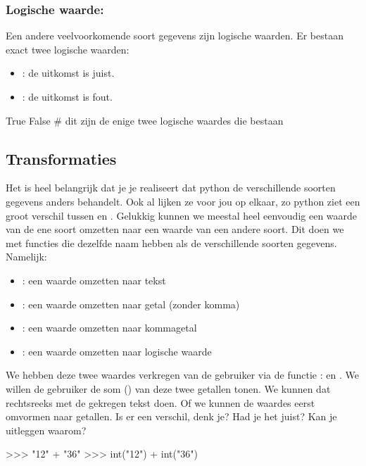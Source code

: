 \subsubsection{Logische waarde: \booleantype}

Een andere veelvoorkomende soort gegevens zijn logische waarden.
Er bestaan exact twee logische waarden:
\begin{itemize}
	\item \true: de uitkomst is juist.
	\item \false: de uitkomst is fout.
\end{itemize}
\begin{pyEnv}
True
False
# dit zijn de enige twee logische waardes die bestaan
\end{pyEnv}

\subsection{Transformaties}

Het is heel belangrijk dat je je realiseert dat python de verschillende soorten gegevens anders behandelt.
Ook al lijken ze voor jou op elkaar, zo python ziet een groot verschil tussen  en .
Gelukkig kunnen we meestal heel eenvoudig een waarde van de ene soort omzetten naar een waarde van een andere soort.
Dit doen we met functies die dezelfde naam hebben als de verschillende soorten gegevens.  %
Namelijk:
\begin{itemize}
	\item {}: een waarde omzetten naar tekst
	\item {}: een waarde omzetten naar getal (zonder komma)
	\item {}: een waarde omzetten naar kommagetal
	\item {}: een waarde omzetten naar logische waarde
\end{itemize}

\begin{letsTryOut}
	We hebben deze twee waardes verkregen van de gebruiker via de functie :
	 en .
	\newline
	We willen de gebruiker de som (\pySnip{+}) van deze twee getallen tonen.
	We kunnen dat rechtsreeks met de gekregen tekst doen.
	Of we kunnen de waardes eerst omvormen naar getallen.
	\newline
	Is er een verschil, denk je?
	\newline
	Had je het juist? Kan je uitleggen waarom?
\begin{pyEnv}
>>> "12" + "36"
>>> int("12") + int("36")
\end{pyEnv}
\end{letsTryOut}

